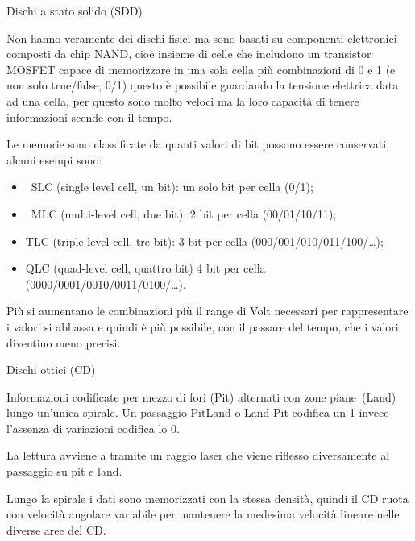 \documentclass[
]{article}
\providecommand{\tightlist}{%
  \setlength{\itemsep}{0pt}\setlength{\parskip}{0pt}}
\begin{document}
{}

{Dischi a stato solido (SDD)}

{Non hanno veramente dei dischi fisici ma sono basati su }{componenti
elettronici }{composti da chip }{NAND}{, cioè insieme di celle che
includono un transistor MOSFET capace di memorizzare in una sola cella
più combinazioni di 0 e 1 (e non solo true/false, 0/1) questo è
possibile guardando la tensione elettrica data ad una cella, per questo
sono molto veloci ma la loro capacità di tenere informazioni scende con
il tempo.}

{}

{}

{Le memorie sono }{classificate }{da quanti valori di bit possono essere
conservati, alcuni esempi sono:}

{}

\begin{itemize}
\tightlist
\item
  {~SLC (single level cell, un bit): un solo bit per cella (0/1);}
\item
  {~MLC (multi-level cell, due bit): 2 bit per cella (00/01/10/11);}
\item
  {TLC (triple-level cell, tre bit): 3 bit per cella
  (000/001/010/011/100/\ldots);}
\item
  {QLC (quad-level cell, quattro bit) 4 bit per cella
  (0000/0001/0010/0011/0100/\ldots).}
\end{itemize}

{}

{Più si aumentano le combinazioni più il range di Volt necessari per
rappresentare i valori si abbassa e quindi è più possibile, con il
passare del tempo, che i valori diventino meno precisi.}

{}

{Dischi ottici (CD)}

{Informazioni }{codificate }{per mezzo di }{fori }{(Pit) alternati con
}{zone piane}{~(Land) lungo un'unica spirale. Un passaggio PitLand o
Land-Pit codifica un 1 invece l'assenza di variazioni codifica lo 0.}

{}

{La }{lettura }{avviene a tramite un raggio laser che viene riflesso
diversamente al passaggio su pit e land. }

{}

{Lungo la spirale }{i dati sono memorizzati con la stessa densità}{,
quindi il CD ruota con velocità angolare variabile per mantenere la
medesima velocità lineare nelle diverse aree del CD.}
\end{document}

